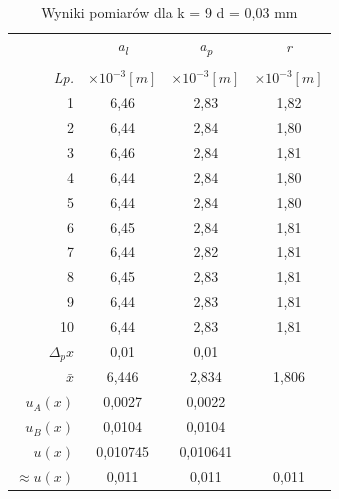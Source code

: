 \documentclass[polish, 11pt, a4paper]{article}
\begin{document}
\begin{table}[H]
\begin{minipage}{.5\textwidth}
		\end{minipage}%
		\begin{minipage}{.5\textwidth}
			\centering
			\captionsetup{singlelinecheck=false, margin = .5cm, justification=centering}
			\caption{Wyniki pomiarów dla k = 9 \newline d = 0,03 mm}
			\begin{tabular}{|r|c|c|c|} \hline
					&	\textit{a\textsubscript{l}}	&	\textit{a\textsubscript{p}}	&	\textit{r}	\\
				&&& \\[-1em]
				\textit{Lp.}& \(\times{10^{-3} [m]}\)& \(\times{10^{-3} [m]}\)& \(\times{10^{-3} [m]}\) \\\hline
				1	&	6,46	&	2,83	&	1,82	\\\hline
				2	&	6,44	&	2,84	&	1,80	\\\hline
				3	&	6,46	&	2,84	&	1,81	\\\hline
				4	&	6,44	&	2,84	&	1,80	\\\hline
				5	&	6,44	&	2,84	&	1,80	\\\hline
				6	&	6,45	&	2,84	&	1,81	\\\hline
				7	&	6,44	&	2,82	&	1,81	\\\hline
				8	&	6,45	&	2,83	&	1,81	\\\hline
				9	&	6,44	&	2,83	&	1,81	\\\hline
				10	&	6,44	&	2,83	&	1,81	\\\hline
				\(\Delta{_px}\)	&	0,01	&	0,01	&		\\\hline
				\(\bar{x}\)	&	6,446	&	2,834	&	1,806	\\\hline
				\(u_A(x)\)	&	0,0027	&	0,0022	&		\\\hline
				\(u_B(x)\)	&	0,0104	&	0,0104	&		\\\hline
				\(u(x)\)	&	0,010745	&	0,010641	&		\\\hline
				\(\approx{u(x)}\)	&	0,011	&	0,011	&	0,011	\\\hline
			\end{tabular}
			\vspace{0.75cm}


\end{minipage}
\end{table}
\end{document}
